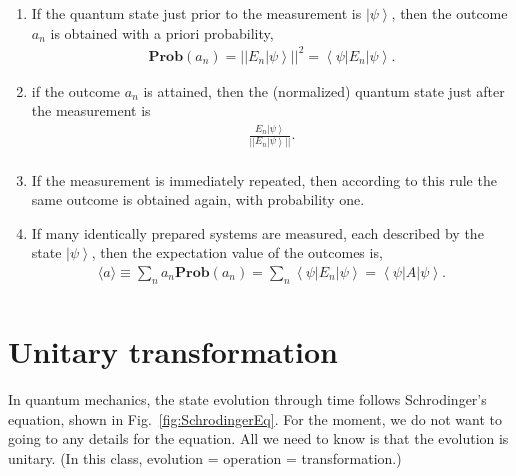 \documentclass[onecolumn,pra,superscriptaddress,nofootinbib]{revtex4-1}
\newcommand{\bra}[1]{\mbox{$\left\langle #1 \right|$}}
\newcommand{\ket}[1]{\mbox{$\left| #1 \right\rangle$}}
\begin{document}
\begin{enumerate}
\item
If the quantum state just prior to the measurement is $\ket{\psi}$, then the outcome $a_n$ is obtained
with a priori probability,
\begin{equation} \label{priori probability}
\begin{aligned}
\mathbf{Prob}(a_n)=||E_n\ket{\psi}||^2=\bra{\psi}E_n\ket{\psi}.
\end{aligned}
\end{equation}
\item if the outcome $a_n$ is attained, then the (normalized) quantum state
just after the measurement is
\begin{equation} \label{State after measurement}
\begin{aligned}
\frac{E_n\ket{\psi}}{||E_n\ket{\psi}||}.\\
\end{aligned}
\end{equation}

\item
If the measurement is immediately repeated, then according to this rule the same outcome is obtained again, with probability one.

\item
If many identically prepared systems are measured, each described by the state $\ket{\psi}$,
then the expectation value of the outcomes is,
\begin{equation} \label{expectation value}
\begin{aligned}
\langle a\rangle\equiv\sum_{n}a_n\mathbf{Prob}(a_n)=\sum_{n}\bra{\psi}E_n\ket{\psi}=\bra{\psi}A\ket{\psi}.\\
\end{aligned}
\end{equation}

\end{enumerate}




\section{Unitary transformation}
In quantum mechanics, the state evolution through time follows Schrodinger's equation, shown in Fig.~\ref{fig:SchrodingerEq}. For the moment, we do not want to going to any details for the equation. All we need to know is that the evolution is unitary. (In this class, evolution = operation = transformation.)
\end{document}
